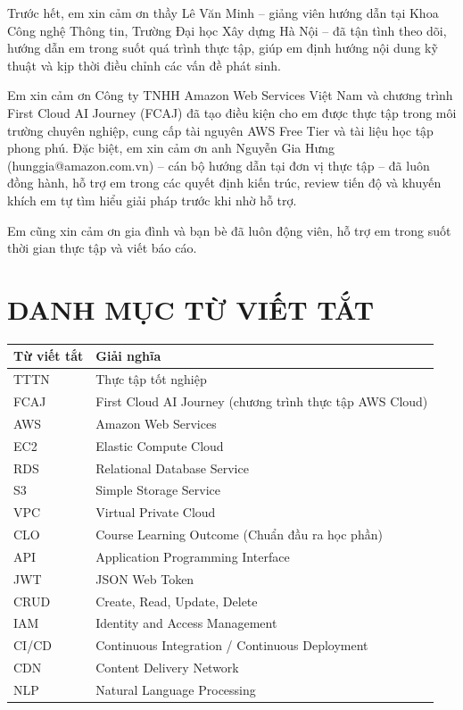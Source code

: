 \documentclass[13pt]{extarticle}
\makeatletter
\newcommand{\gvhd}{Lê Văn Minh}
\newcommand{\mentorCT}{Nguyễn Gia Hưng}
\newcommand{\emailMentor}{hunggia@amazon.com.vn}
\makeatother
\begin{document}
Trước hết, em xin cảm ơn thầy \gvhd{} -- giảng viên hướng dẫn tại Khoa Công nghệ
Thông tin, Trường Đại học Xây dựng Hà Nội -- đã tận tình theo dõi, hướng dẫn em trong
suốt quá trình thực tập, giúp em định hướng nội dung kỹ thuật và kịp thời điều chỉnh
các vấn đề phát sinh.

Em xin cảm ơn Công ty TNHH Amazon Web Services Việt Nam và chương trình First Cloud AI
Journey (FCAJ) đã tạo điều kiện cho em được thực tập trong môi trường chuyên nghiệp,
cung cấp tài nguyên AWS Free Tier và tài liệu học tập phong phú. Đặc biệt, em xin
cảm ơn anh \mentorCT{} (\emailMentor) -- cán bộ hướng dẫn tại đơn vị thực tập
-- đã luôn đồng hành, hỗ trợ em trong các quyết định kiến trúc, review tiến độ và
khuyến khích em tự tìm hiểu giải pháp trước khi nhờ hỗ trợ.

Em cũng xin cảm ơn gia đình và bạn bè đã luôn động viên, hỗ trợ em trong suốt thời
gian thực tập và viết báo cáo.

\newpage

\tableofcontents
\newpage

\listoffigures
{}
\newpage

\listoftables
{}
\newpage

\section*{DANH MỤC TỪ VIẾT TẮT}
\begin{longtable}{p{3cm}p{11cm}}
\toprule
\textbf{Từ viết tắt} & \textbf{Giải nghĩa} \\
\midrule
\endhead
TTTN & Thực tập tốt nghiệp \\
FCAJ & First Cloud AI Journey (chương trình thực tập AWS Cloud) \\
AWS & Amazon Web Services \\
EC2 & Elastic Compute Cloud \\
RDS & Relational Database Service \\
S3 & Simple Storage Service \\
VPC & Virtual Private Cloud \\
CLO & Course Learning Outcome (Chuẩn đầu ra học phần) \\
API & Application Programming Interface \\
JWT & JSON Web Token \\
CRUD & Create, Read, Update, Delete \\
IAM & Identity and Access Management \\
CI/CD & Continuous Integration / Continuous Deployment \\
CDN & Content Delivery Network \\
NLP & Natural Language Processing \\
\bottomrule
\end{longtable}
\newpage
\end{document}

